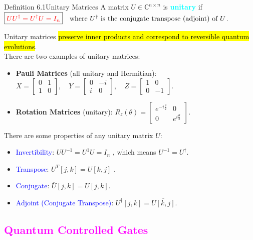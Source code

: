 \documentclass{book}
\begin{document}
\begin{defBox}{Definition 6.1}{Unitary Matrices}
A matrix $U \in \mathbb{C}^{n \times n}$ is \textbf{\textcolor{cyan}{unitary}} if
$\boxed{\textcolor{red}{U U^\dagger = U^\dagger U = I_n}} \quad \text{where } U^\dagger \text{ is the conjugate transpose (adjoint) of } U$.
\end{defBox}
Unitary matrices \hl{preserve inner products and correspond to reversible quantum evolutions}.\\
\vspace{2mm}
There are two examples of unitary matrices: 
\begin{itemize}
    \item \textbf{Pauli Matrices} (all unitary and Hermitian): $
    X = \begin{bmatrix} 0 & 1 \\ 1 & 0 \end{bmatrix}, \quad
    Y = \begin{bmatrix} 0 & -i \\ i & 0 \end{bmatrix}, \quad
    Z = \begin{bmatrix} 1 & 0 \\ 0 & -1 \end{bmatrix}$.
    \item \textbf{Rotation Matrices} (unitary): $R_z(\theta) = \begin{bmatrix} e^{-i\frac{\theta}{2}} & 0 \\ 0 & e^{i\frac{\theta}{2}} \end{bmatrix}$.
\end{itemize}

There are some properties of any unitary matrix $U$:
\begin{itemize}
    \item \textcolor{blue}{Invertibility}: $\boxed{U U^{-1} = U^{1} U = I_n}$ , which means $U^{-1} = U^\dagger$.
    \item \textcolor{blue}{Transpose}: $\boxed{U^T[j,k] = U[k,j]}$ .
    \item \textcolor{blue}{Conjugate}: $\boxed{\overline{U}[j,k] = \overline{U[j,k]}}$.
    \item \textcolor{blue}{Adjoint (Conjugate Transpose)}: $\boxed{U^\dagger[j,k] = \overline{U[k,j]}}$.
\end{itemize}

\textcolor{magenta}{\section{\textbf{Quantum Controlled Gates}}}
\end{document}
